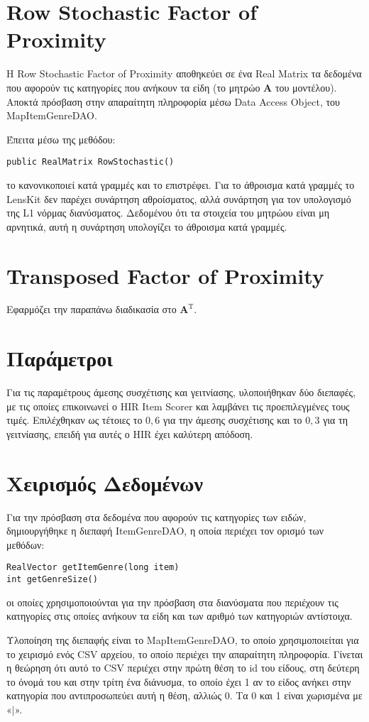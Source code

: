 \section{\en Row Stochastic Factor of Proximity}
\el Η {\en Row Stochastic Factor of Proximity} αποθηκεύει σε ένα {\en Real Matrix} τα δεδομένα που αφορούν τις κατηγορίες που ανήκουν τα είδη (το μητρώο $\mathbf{A}$ του μοντέλου). Αποκτά πρόσβαση στην απαραίτητη πληροφορία μέσω {\en Data Access Object}, του {\en MapItemGenreDAO}. \par
Έπειτα μέσω της μεθόδου:
\en \begin{verbatim}
public RealMatrix RowStochastic()
\end{verbatim}
\el το κανονικοποιεί κατά γραμμές και το επιστρέφει. Για το άθροισμα κατά γραμμές το {\en LensKit} δεν παρέχει συνάρτηση αθροίσματος, αλλά συνάρτηση για τον υπολογισμό της {\en L1} νόρμας διανύσματος. Δεδομένου ότι τα στοιχεία του μητρώου είναι μη αρνητικά, αυτή η συνάρτηση υπολογίζει το άθροισμα κατά γραμμές. 
\section{\en Transposed Factor of Proximity}
Εφαρμόζει την παραπάνω διαδικασία στο $\mathbf{A}^\text{T}$.
\section{Παράμετροι}
Για τις παραμέτρους άμεσης συσχέτισης και γειτνίασης, υλοποιήθηκαν δύο διεπαφές, με τις οποίες επικοινωνεί ο {\en HIR Item Scorer} και λαμβάνει τις προεπιλεγμένες τους τιμές. Επιλέχθηκαν ως τέτοιες το $0,6$ για την άμεσης συσχέτισης και το $0,3$ για τη γειτνίασης, επειδή για αυτές ο {\en HIR} έχει καλύτερη απόδοση. \cite{Nikolakopoulos2015126}
\section{Χειρισμός Δεδομένων}
Για την πρόσβαση στα δεδομένα που αφορούν τις κατηγορίες των ειδών, δημιουργήθηκε η διεπαφή {\en ItemGenreDAO}, η οποία περιέχει τον ορισμό των μεθόδων:
\en \begin{verbatim}
RealVector getItemGenre(long item)
int getGenreSize()
\end{verbatim}
\el οι οποίες χρησιμοποιούνται για την πρόσβαση στα διανύσματα που περιέχουν τις κατηγορίες στις οποίες ανήκουν τα είδη και των αριθμό των κατηγοριών αντίστοιχα. \par
Υλοποίηση της διεπαφής είναι το {\en MapItemGenreDAO}, το οποίο χρησιμοποιεί\-ται για το χειρισμό ενός {\en CSV} αρχείου, το οποίο περιέχει την απαραίτητη πληροφορία. Γίνεται η θεώρηση ότι αυτό το {\en CSV} περιέχει στην πρώτη θέση το {\en id} του είδους, στη δεύτερη το όνομά του και στην τρίτη ένα διάνυσμα, το οποίο έχει 1 αν το είδος ανήκει στην κατηγορία που αντιπροσωπεύει αυτή η θέση, αλλιώς 0. Τα 0 και 1 είναι χωρισμένα με «$|$».
